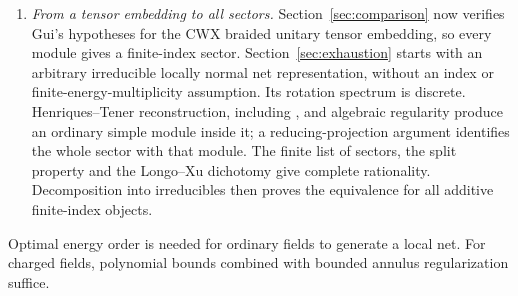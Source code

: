 \documentclass[11pt]{article}
\numberwithin{equation}{section}
\theoremstyle{definition}
\theoremstyle{remark}
\begin{document}
\begin{enumerate}
\item \emph{From a tensor embedding to all sectors.} Section~\ref{sec:comparison} now verifies Gui's hypotheses for the CWX braided unitary tensor embedding, so every module gives a finite-index sector. Section~\ref{sec:exhaustion} starts with an arbitrary irreducible locally normal net representation, without an index or finite-energy-multiplicity assumption. Its rotation spectrum is discrete. Henriques--Tener reconstruction, including \cite[Remark~9.8]{HTVOA}, and algebraic regularity produce an ordinary simple module inside it; a reducing-projection argument identifies the whole sector with that module. The finite list of sectors, the split property and the Longo--Xu dichotomy give complete rationality. Decomposition into irreducibles then proves the equivalence for all additive finite-index objects.
\end{enumerate}

Optimal energy order is needed for ordinary fields to generate a local net. For charged fields, polynomial bounds combined with bounded annulus regularization suffice.










\end{document}
